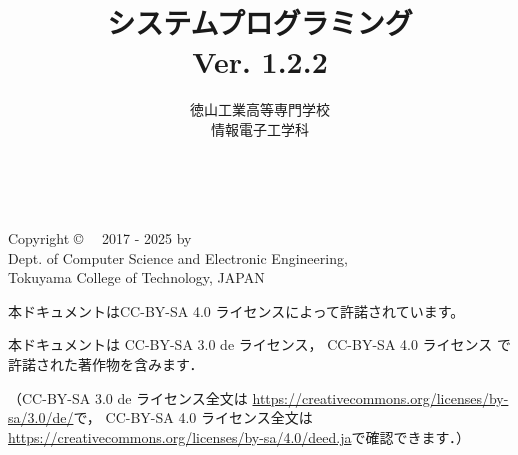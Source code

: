 \documentclass[a4paper,11pt,twocolumn]{ltjsbook}      %
\begin{document}
\frontmatter
\title{システムプログラミング\\Ver. 1.2.2}
\author{徳山工業高等専門学校\\情報電子工学科}
\date{}
\maketitle

\thispagestyle{empty}
\onecolumn
~
\vfill
\begin{flushleft}
Copyright \copyright ~~ 2017 - 2025 by \\
Dept. of Computer Science and Electronic Engineering, \\
Tokuyama College of Technology, JAPAN
\end{flushleft}

\vspace{0.8cm}
本ドキュメントはCC-BY-SA 4.0 ライセンスによって許諾されています。

本ドキュメントは
CC-BY-SA 3.0 de ライセンス，
CC-BY-SA 4.0 ライセンス
で許諾された著作物を含みます．

（CC-BY-SA 3.0 de ライセンス全文は
\url{https://creativecommons.org/licenses/by-sa/3.0/de/}で，
CC-BY-SA 4.0 ライセンス全文は
\url{https://creativecommons.org/licenses/by-sa/4.0/deed.ja}で確認できます．）

\setcounter{tocdepth}{2}
\tableofcontents

\mainmatter

\end{document}
